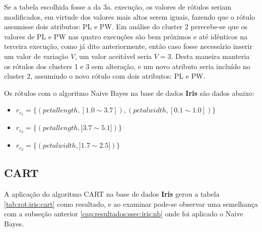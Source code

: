 Se a tabela escolhida fosse a da 3a. execução, os valores de rótulos seriam modificados, em virtude dos valores mais altos serem iguais, fazendo que o rótulo assumisse dois atributos: PL e PW. Em análise do cluster 2 perecebe-se que os valores de PL e PW nas quatro execuções são bem próximos e até idênticos na terceira execução, como já dito anteriormente, então caso fosse necessário inserir um valor de variação ${V}$, um valor aceitável seria ${V=3}$. Desta maneira manteria os rótulos dos clusters 1 e 3 sem alteração, e um novo atributo seria incluído no cluster 2, assumindo o novo rótulo com dois atributos: PL e PW.

Os rótulos com o algoritmo Naive Bayes na base de dados \textbf{Iris} são dados abaixo:
\begin{itemize}[noitemsep]
 \item ${r_{c_1}=\{ (petallength, [ 1.0 \sim 3.7]), (petalwidth,[ 0.1 \sim 1.0 ] ) \} }$  
 \item ${r_{c_2}=\{ (petallength, ] 3.7 \sim 5.1]) \} }$
 \item ${r_{c_3}=\{ (petalwidth, ] 1.7 \sim 2.5 ]) \} }$
\end{itemize}

\subsection{CART} \label{cap:resultados:ssec:iris:cart}

A aplicação do algoritmo CART na base de dados \textbf{Iris} gerou a tabela \ref{tab:rot:iris:cart} como resultado, e ao examinar pode-se observar uma semelhança com a subseção anterior \ref{cap:resultados:ssec:iris:nb} onde foi aplicado o Naive Bayes. 

